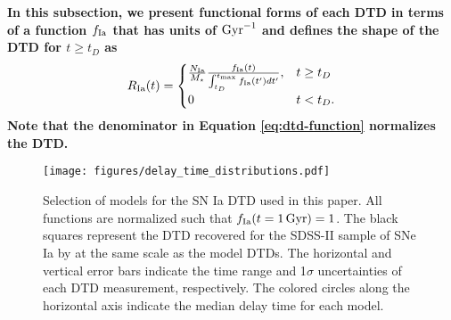 \documentclass[twocolumn,twocolappendix,linenumbers]{aastex631}
\newcommand{\vice}{{\tt VICE}\xspace}
\begin{document}
{\bf In this subsection, we present functional forms of each DTD in terms of a function $f_{\rm Ia}$ that has units of ${\rm Gyr}^{-1}$ and defines the shape of the DTD for $t\ge t_D$ as}
\begin{equation}
    R_{\rm Ia}(t) = 
    \begin{cases}
        \frac{N_{\rm Ia}}{M_\star}
        \frac{f_{\rm Ia}(t)}{\int_{t_D}^{t_{\rm max}} f_{\rm Ia}(t') dt'}, & t \ge t_D \\
        0 & t < t_D.
    \end{cases}
    \label{eq:dtd-function}
\end{equation}
{\bf Note that the denominator in Equation \ref{eq:dtd-function} normalizes the DTD.}

\begin{figure}
    \centering
    \texttt{[image: figures/delay\_time\_distributions.pdf]}
    \caption{Selection of models for the SN Ia DTD used in this paper. All functions are normalized such that $f_{\rm Ia}(t=1\,{\rm Gyr})=1$. The black squares represent the DTD recovered for the SDSS-II sample of SNe Ia by \citet{Maoz2012-SloanIIDTD} at the same scale as the model DTDs. The horizontal and vertical error bars indicate the time range and 1$\sigma$ uncertainties of each DTD measurement, respectively. The colored circles along the horizontal axis indicate the median delay time for each model.}
    \label{fig:dtds}
\end{figure}
\end{document}
